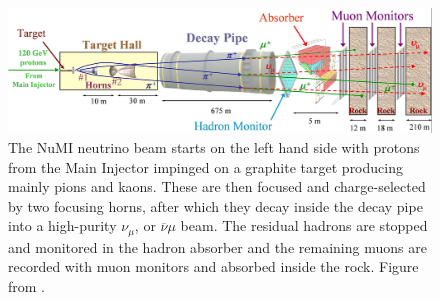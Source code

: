 \begin{figure}[!hbtp]
\centering
\includegraphics[width=\textwidth]{Plots/NOvAExperiment/BeamlineAlternative.jpg}
\caption[The schematic of the NuMI beam facility]{
The NuMI neutrino beam starts on the left hand side with protons from the Main Injector impinged on a graphite target producing mainly pions and kaons. These are then focused and charge-selected by two focusing horns, after which they decay inside the decay pipe into a high-purity $\nu_\mu$, or $\overline{\nu}\mu$ beam. The residual hadrons are stopped and monitored in the hadron absorber and the remaining muons are recorded with muon monitors and absorbed inside the rock. Figure from \cite{NuMI.pdf}.
}
\label{fig:NOvANuMI}
\end{figure}

